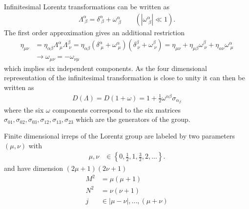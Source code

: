 \documentclass[10pt,a4paper]{article}
\theoremstyle{definition}
\begin{document}
Infinitesimal Lorentz transformations can be written as
\begin{align}
    \Lambda^\alpha_{\;\beta}=\delta^\alpha_{\;\beta}+\omega^\alpha_{\;\beta}\qquad(|\omega^\alpha_{\;\beta}|\ll 1).
\end{align}
The first order approximation gives an additional restriction
\begin{align}
    \eta_{\mu\nu} &= \eta_{\alpha\beta}\Lambda^\alpha_{\;\mu}\Lambda^\beta_{\;\nu}=\eta_{\alpha\beta}(\delta^\alpha_{\;\mu}+\omega^\alpha_{\;\mu})(\delta^\beta_{\;\nu}+\omega^\beta_{\;\nu})=\eta_{\mu\nu}+\eta_{\mu\beta}\omega^\beta_{\;\nu}+\eta_{\alpha\nu}\omega^\alpha_{\;\mu}\\
    &\rightarrow \omega_{\mu\nu}=-\omega_{\nu\mu}
\end{align}
which implies six independent components. As the four dimensional representation of the infinitesimal transformation is close to unity it can then be written as
\begin{align}
    D(\Lambda)=D(1+\omega)=1+\frac{1}{2}\omega^{\alpha\beta}\sigma_{\alpha_\beta}
\end{align}
where the six $\omega$ components correspond to the six matrices $\sigma_{01},\sigma_{02},\sigma_{03},\sigma_{12},\sigma_{13},\sigma_{23}$ which are the generators of the group.


Finite dimensional irreps of the Lorentz group are labeled by two parameters $(\mu,\nu)$ with
\begin{align}
    \mu,\nu &\in \left\{0,\frac{1}{2},1,\frac{3}{2},2,...\right\}.
\end{align}
and have dimension $(2\mu+1)(2\nu+1)$
\begin{align*}
    M^2&=\mu(\mu+1)\\
    N^2&=\nu(\nu+1)\\
    j  &\in |\mu-\nu|, ..., (\mu+\nu)
\end{align*}
\end{document}
